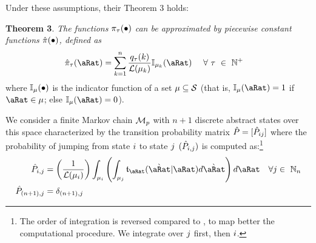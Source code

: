 \documentclass[\econtexRoot/BufferStockTheory.tex]{subfiles}
\begin{document}
Under these assumptions, their Theorem 3 holds:

\textbf{Theorem 3}. \textit{The functions $\pi_{\tau}(\bullet)$ can  be approximated by piecewise constant functions $\hat{\pi}(\bullet)$, defined as}
\begin{equation}\begin{gathered}\begin{aligned}\label{eq:PrbBinNxtFmPntNow}
  \DnsPntAprx_{\tAbs}(\pnt) &= \sum_{\LoopC=1}^{\NumAprxStes} \frac{\pmfBinNow_{\tAbs}(\LoopC)}{\Lebes(\SetPartCnts_{\LoopC})} \mathbb{I}_{\SetPartCnts_{\LoopC}}(\pnt)~~~~\forall~\tAbs~\in~\Nteger^{+}
\end{aligned}\end{gathered}\end{equation}where $\mathbb{I}_{\mu}(\bullet)$ is the indicator function of a set $\mu \subseteq \mathcal{S}$ (that is, $\mathbb{I}_{\SetPartCnts}(\pnt) = 1$ if $\pnt \in \SetPartCnts$; else $\mathbb{I}_{\SetPartCnts}(\pnt) = 0$).  %


We consider a finite Markov chain $\mathcal{M}_{p}$ with $n+1$ discrete abstract states over this space characterized by the transition probability matrix $\hat{P} = [\hat{P}_{ij}]$ where the probability of jumping from state $i$ to state $j$ $(\hat{P}_{i,j})$ is computed as:\footnote{The order of integration is reversed compared to \cite{saDiscrete}, to map better the computational procedure.  We integrate over $j$ first, then $i$.}
\begin{equation}\begin{gathered}\begin{aligned}
  \TnsMrkv_{\thisBin,\thatBin} &= \left(\frac{1}{\Lebes(\SetPartCnts_{\thisBin})}\right)\int_{\SetPartCnts_{\thisBin}}\left(\int_{\SetPartCnts_{\thatBin}}\DnsPntNxtFmPntNow_{\pnt}(\Nxt{\pnt}|\pnt){d\Nxt{\pnt}}\right){d\pnt}~~~\forall\thatBin \in~ \Nteger_{\NumAprxStes} \label{eq:thisTOthat}
  \\ \TnsMrkv_{\NumAprxStesPls,\thatBin} &= \delta_{\NumAprxStesPls,\thatBin}\notag
\end{aligned}\end{gathered}\end{equation}
\end{document}
